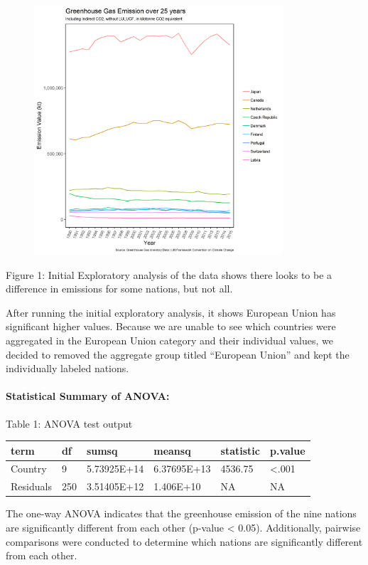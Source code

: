 \documentclass[]{article}
\let\oldparagraph\paragraph
\renewcommand{\paragraph}[1]{\oldparagraph{#1}\mbox{}}
\begin{document}
\begin{figure}
\centering
\includegraphics[width=3.64583in]{../results/fig/GHG_explore.png}
\caption{}
\end{figure}

Figure 1: Initial Exploratory analysis of the data shows there looks to
be a difference in emissions for some nations, but not all.

After running the initial exploratory analysis, it shows European Union
has significant higher values. Because we are unable to see which
countries were aggregated in the European Union category and their
individual values, we decided to removed the aggregate group titled
``European Union'' and kept the individually labeled nations.

\paragraph{Statistical Summary of
ANOVA:}\label{statistical-summary-of-anova}

Table 1: ANOVA test output

\begin{longtable}[]{@{}llllll@{}}
\toprule
term & df & sumsq & meansq & statistic & p.value\tabularnewline
\midrule
\endhead
Country & 9 & 5.73925E+14 & 6.37695E+13 & 4536.75 &
\textless{}.001\tabularnewline
Residuals & 250 & 3.51405E+12 & 1.406E+10 & NA & NA\tabularnewline
\bottomrule
\end{longtable}

The one-way ANOVA indicates that the greenhouse emission of the nine
nations are significantly different from each other (p-value \textless{}
0.05). Additionally, pairwise comparisons were conducted to determine
which nations are significantly different from each other.
\end{document}
